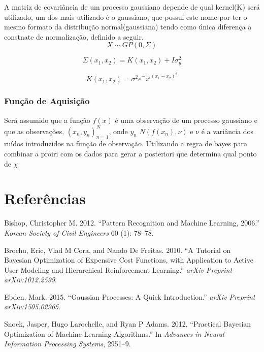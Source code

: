 \documentclass[
	12pt,				%
	openright,			%
	twoside,			%
	a4paper,			%
	english,			%
	french,				%
	spanish,			%
	brazil,				%
]{abntex2}
\begin{document}
A matriz de covariância de um processo gaussiano depende de qual
kernel(K) será utilizado, um dos mais utilizado é o gaussiano, que
possui este nome por ter o mesmo formato da distribução
normal(gaussiana) tendo como única diferença a constnate de
normalização, definido a seguir.\\

\[
X \sim GP(0,\Sigma)
\]

\[
\Sigma(x_1,x_2) = K(x_1,x_2) + I\sigma^2_y
\]

\[
K(x_1,x_2) = \sigma^2 e^{-\frac{1}{2l^2}(x_1-x_2)^2}
\]

\hypertarget{funuxe7uxe3o-de-aquisiuxe7uxe3o}{%
\subsection{Função de Aquisição}\label{funuxe7uxe3o-de-aquisiuxe7uxe3o}}

Será assumido que a função \(f(x)\) é uma observação de um processo
gaussiano e que as observações, \((x_n,y_n)_{n=1}^N\), onde
\(y_n \mbox{~} N(f(x_n),\nu)\) e \(\nu\) é a variância dos ruídos
introduzidos na função de observação. Utilizando a regra de bayes para
combinar a proiri com os dados para gerar a posteriori que determina
qual ponto de \(\chi\)

\newpage

\hypertarget{referuxeancias}{%
\chapter*{Referências}\label{referuxeancias}}

\hypertarget{refs}{}
\leavevmode\hypertarget{ref-bishop2012pattern}{}%
Bishop, Christopher M. 2012. ``Pattern Recognition and Machine Learning,
2006.'' \emph{Korean Society of Civil Engineers} 60 (1): 78--78.

\leavevmode\hypertarget{ref-brochu2010tutorial}{}%
Brochu, Eric, Vlad M Cora, and Nando De Freitas. 2010. ``A Tutorial on
Bayesian Optimization of Expensive Cost Functions, with Application to
Active User Modeling and Hierarchical Reinforcement Learning.''
\emph{arXiv Preprint arXiv:1012.2599}.

\leavevmode\hypertarget{ref-ebden2015gaussian}{}%
Ebden, Mark. 2015. ``Gaussian Processes: A Quick Introduction.''
\emph{arXiv Preprint arXiv:1505.02965}.

\leavevmode\hypertarget{ref-snoek2012practical}{}%
Snoek, Jasper, Hugo Larochelle, and Ryan P Adams. 2012. ``Practical
Bayesian Optimization of Machine Learning Algorithms.'' In
\emph{Advances in Neural Information Processing Systems}, 2951--9.

\postextual




\printindex
\end{document}

